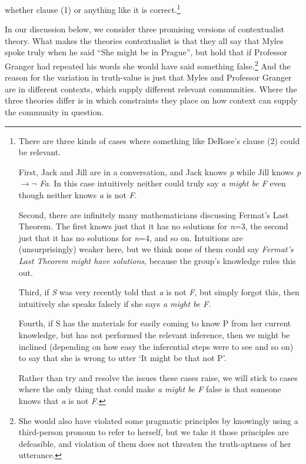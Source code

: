 \documentclass[
  10pt,
  letterpaper,
  DIV=11,
  numbers=noendperiod,
  twoside]{scrartcl}
\begin{document}
whether clause (1) or anything like it is correct.\footnote{There are
  three kinds of cases where something like DeRose's clause (2) could be
  relevant.

  First, Jack and Jill are in a conversation, and Jack knows \emph{p}
  while Jill knows \emph{p} \({\rightarrow \neg}\) \emph{Fa}. In this
  case intuitively neither could truly say \emph{a might be F} even
  though neither knows \emph{a} is not \emph{F}.

  Second, there are infinitely many mathematicians discussing Fermat's
  Last Theorem. The first knows just that it has no solutions for
  \emph{n}=3, the second just that it has no solutions for \emph{n}=4,
  and so on. Intuitions are (unsurprisingly) weaker here, but we think
  none of them could say \emph{Fermat's Last Theorem} \emph{might have
  solutions}, because the group's knowledge rules this out.

  Third, if \emph{S} was very recently told that \emph{a} is not
  \emph{F}, but simply forgot this, then intuitively she speaks falsely
  if she says \emph{a might be F}.

  Fourth, if S has the materials for easily coming to know P from her
  current knowledge, but has not performed the relevant inference, then
  we might be inclined (depending on how easy the inferential steps were
  to see and so on) to say that she is wrong to utter `It might be that
  not P'.

  Rather than try and resolve the issues these cases raise, we will
  stick to cases where the only thing that could make \emph{a might be
  F} false is that someone knows that \emph{a} is not \emph{F}.}

In our discussion below, we consider three promising versions of
contextualist theory. What makes the theories contextualist is that they
all say that Myles spoke truly when he said ``She might be in Prague'',
but hold that if Professor Granger had repeated his words she would have
said something false.\footnote{She would also have violated some
  pragmatic principles by knowingly using a third-person pronoun to
  refer to herself, but we take it those principles are defeasible, and
  violation of them does not threaten the truth-aptness of her
  utterance.} And the reason for the variation in truth-value is just
that Myles and Professor Granger are in different contexts, which supply
different relevant communities. Where the three theories differ is in
which constraints they place on how context can supply the community in
question.
\end{document}
